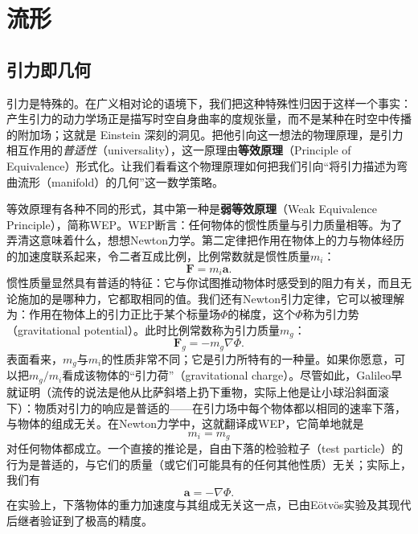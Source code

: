 
\chapter{流形}

\section{引力即几何}

引力是特殊的。在广义相对论的语境下，我们把这种特殊性归因于这样一个事实：产生引力的动力学场正是描写时空自身曲率的度规张量，而不是某种在时空中传播的附加场；这就是 Einstein 深刻的洞见。把他引向这一想法的物理原理，是引力相互作用的\emph{普适性}（universality），这一原理由\textbf{等效原理}（Principle of Equivalence）形式化。让我们看看这个物理原理如何把我们引向“将引力描述为弯曲流形（manifold）的几何”这一数学策略。

等效原理有各种不同的形式，其中第一种是\textbf{弱等效原理}（Weak Equivalence Principle），简称WEP。WEP断言：任何物体的惯性质量与引力质量相等。为了弄清这意味着什么，想想Newton力学。第二定律把作用在物体上的力与物体经历的加速度联系起来，令二者互成比例，比例常数就是惯性质量$m_i$：
\begin{equation*}
\mathbf{F} = m_i\mathbf{a}.
\tag{2.1}
\end{equation*}
惯性质量显然具有普适的特征：它与你试图推动物体时感受到的阻力有关，而且无论施加的是哪种力，它都取相同的值。我们还有Newton引力定律，它可以被理解为：作用在物体上的引力正比于某个标量场$\Phi$的梯度，这个$\Phi$称为引力势（gravitational potential）。此时比例常数称为引力质量$m_g$：
\begin{equation*}
\mathbf{F}_g = -m_g\nabla\Phi.
\tag{2.2}
\end{equation*}
表面看来，$m_g$与$m_i$的性质非常不同；它是引力所特有的一种量。如果你愿意，可以把$m_g/m_i$看成该物体的“引力荷”（gravitational charge）。尽管如此，Galileo早就证明（流传的说法是他从比萨斜塔上扔下重物，实际上他是让小球沿斜面滚下）：物质对引力的响应是普适的——在引力场中每个物体都以相同的速率下落，与物体的组成无关。在Newton力学中，这就翻译成WEP，它简单地就是
\begin{equation*}
m_i = m_g
\tag{2.3}
\end{equation*}
对任何物体都成立。一个直接的推论是，自由下落的检验粒子（test particle）的行为是普适的，与它们的质量（或它们可能具有的任何其他性质）无关；实际上，我们有
\begin{equation*}
\mathbf{a} = -\nabla\Phi.
\tag{2.4}
\end{equation*}
在实验上，下落物体的重力加速度与其组成无关这一点，已由Eötvös实验及其现代后继者验证到了极高的精度。

